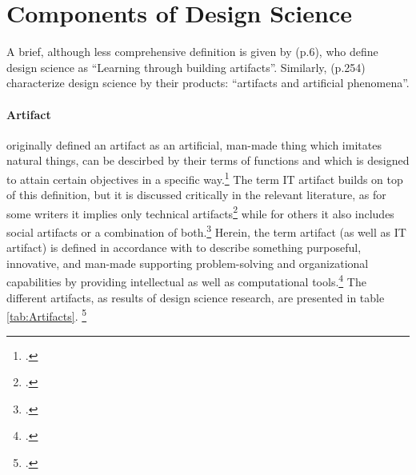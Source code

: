 \section{Components of Design Science}
A brief, although less comprehensive definition is given by \cite{VaishnaviDesignScienceResearch} (p.6), who define design science as \enquote{Learning through building artifacts}. Similarly, \cite{MarchDesignnaturalscience1995} (p.254) characterize design science by their products: \enquote{artifacts and artificial phenomena}. 

\paragraph{Artifact} \cite{Simonsciencesartificial1996}  originally defined an artifact as an artificial, man-made thing which imitates natural things, can be descirbed by their terms of functions and which is designed to attain certain objectives in a specific way.\footcites[Cf.][p.5]{Simonsciencesartificial1996} The term IT artifact builds on top of this definition, but it is discussed critically in the relevant literature, as for some writers it implies only technical artifacts\footcites[Cf.][p.186]{BenbasatEmpiricalresearchinformation1999}[cf.][p.50]{AlterconceptITartifact2015}[cf.][p.121]{OrlikowskiResearchcommentaryDesperately2001} while for others it also includes social artifacts or a combination of both.\footcites[Cf.][pp.1,6]{LeeGoingbackbasics2015}[cf.][p.59]{AlterconceptITartifact2015} Herein, the term artifact (as well as IT artifact) is defined in accordance with \cite{HevnerDesignScienceResearch2004} to describe something purposeful, innovative, and man-made supporting problem-solving and organizational capabilities by providing intellectual as well as computational tools.\footcites[Cf.][pp.76,82]{HevnerDesignScienceResearch2004}[cf.][p.340]{GregorPositioningpresentingdesign2013} The different artifacts, as results of design science research, are presented in table \ref{tab:Artifacts}. \footcites[Cf.][pp.256-258]{MarchDesignnaturalscience1995}[cf.][p.50]{PuraoDesignResearchTechnology2002}[cf.][p.77]{HevnerDesignResearchInformation2010}


